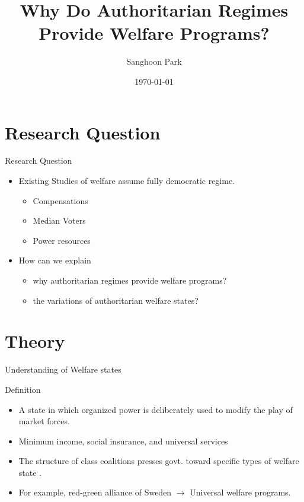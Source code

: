 \documentclass{Bredelebeamer}
\title{Why Do Authoritarian Regimes Provide Welfare Programs?}
\author{Sanghoon Park \inst{1}}
\institute[University of South Carolina]
{
  \inst{1}%
  University of South Carolina\\Department of Political Science}
\date{\today}
\begin{document}
\begin{frame}
  \titlepage
\end{frame}



\section{Research Question}
\begin{frame}[t]{Research Question}
	\begin{itemize}
		\item Existing Studies of welfare assume fully democratic regime.
		\begin{itemize}
			\item Compensations %
			\item Median Voters %
			\item Power resources %
		\end{itemize}%
		\item How can we explain
		\begin{itemize}
			\item why authoritarian regimes provide welfare programs?
			\item the variations of authoritarian welfare states?
		\end{itemize}
	\end{itemize}	
\end{frame}

\section{Theory}
\begin{frame}{Understanding of Welfare states}
\begin{alertblock}{Definition}
	\begin{itemize}
		\item A state in which organized power is deliberately used to modify the play of market forces.
		\item Minimum income, social insurance, and universal services
	\end{itemize}
\end{alertblock}
\begin{itemize}
	\item The structure of class coalitions presses govt. toward specific types of welfare state \citep{Gosta1990}.
	\item For example, red-green alliance of Sweden $\rightarrow$ Universal welfare programs.
\end{itemize}
\end{frame}
\end{document}
